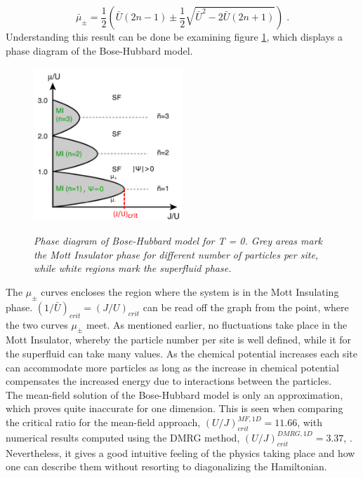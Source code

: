 \begin{equation}
	\bar{\mu}_{\pm} = \frac{1}{2} \left( \bar{U}(2n -1) \pm \frac{1}{2} \sqrt{\bar{U}^2 - 2 \bar{U} (2 n +1)} \right) \; .
\end{equation}
Understanding this result can be done be examining figure \ref{fig:SFMOTT}, which displays a phase diagram of the Bose-Hubbard model.  
\begin{figure}[h]
	\centering
	\includegraphics[width = 0.5\textwidth]{Figures/SFMottPhase.pdf}
	\label{fig:SFMOTT}
	\caption{\textit{Phase diagram of Bose-Hubbard model for T = 0. Grey areas mark the Mott Insulator phase for different number of particles per site, while white regions mark the superfluid phase. \cite{greiner}}}
\end{figure}
The $\mu_{\pm}$ curves encloses the region where the system is in the Mott Insulating phase. $(1/\bar{U})_{crit} = (J/U)_{crit}$ can be read off the graph from the point, where the two curves $\mu_{\pm}$ meet. As mentioned earlier, no fluctuations take place in the Mott Insulator, whereby the particle number per site is well defined, while it for the superfluid can take many values. As the chemical potential increases each site can accommodate more particles as long as the increase in chemical potential compensates the increased energy due to interactions between the particles.\\
The mean-field solution of the Bose-Hubbard model is only an approximation, which proves quite inaccurate for one dimension. This is seen when comparing the critical ratio for the mean-field approach, $\left( U/J \right)_{crit}^{MF,1D} = 11.66$, with numerical results computed using the DMRG method, $\left( U/J \right)_{crit}^{DMRG,1D} = 3.37$, \cite{Kuhner2000}. Nevertheless, it gives a good intuitive feeling of the physics taking place and how one can describe them without resorting to diagonalizing the Hamiltonian.\\